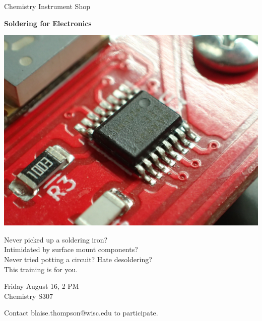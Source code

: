 \documentclass{article}
\begin{document}
\center

\Huge

Chemistry Instrument Shop

\textbf{
Soldering for Electronics
}

\includegraphics[width=\linewidth]{coverart.jpg}

{
\LARGE
Never picked up a soldering iron? \\
Intimidated by surface mount components? \\
Never tried potting a circuit?
Hate desoldering? \\
This training is for you. \\
}

\vfill

{
\huge
Friday August 16, 2 PM \\
Chemistry S307
}

\vfill

{
\huge
Contact blaise.thompson@wisc.edu to participate.
}
\end{document}
